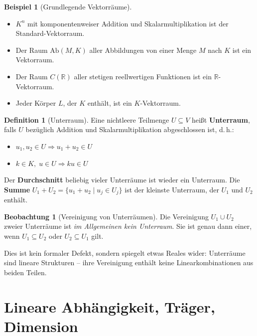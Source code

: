 ﻿\documentclass[a4paper,12pt]{report}
\theoremstyle{definition}
\newtheorem{definition}{Definition}
\newtheorem{beispiel}{Beispiel}
\newtheorem{beobachtung}{Beobachtung}
\begin{document}
\begin{beispiel}[Grundlegende Vektorräume]
    \begin{itemize}
        \item[-] $K^n$ mit komponentenweiser Addition und Skalarmultiplikation
              ist der Standard-Vektorraum.
        \item[-] Der Raum $\mathrm{Ab}(M, K)$ aller Abbildungen von einer
              Menge $M$ nach $K$ ist ein Vektorraum.
        \item[-] Der Raum $C(\mathbb{R})$ aller stetigen reellwertigen Funktionen
              ist ein $\mathbb{R}$-Vektorraum.
        \item[-] Jeder Körper $L$, der $K$ enthält, ist ein $K$-Vektorraum.
    \end{itemize}
\end{beispiel}

\begin{definition}[Unterraum]
    Eine nichtleere Teilmenge $U \subseteq V$ heißt \textbf{Unterraum}, falls
    $U$ bezüglich Addition und Skalarmultiplikation abgeschlossen ist, d.\,h.:
    \begin{itemize}
        \item[-] $u_1, u_2 \in U \Rightarrow u_1 + u_2 \in U$
        \item[-] $k \in K,\; u \in U \Rightarrow ku \in U$
    \end{itemize}
    Der \textbf{Durchschnitt} beliebig vieler Unterräume ist wieder ein
    Unterraum. Die \textbf{Summe} $U_1 + U_2 = \{u_1 + u_2 \mid u_j \in U_j\}$
    ist der kleinste Unterraum, der $U_1$ und $U_2$ enthält.
\end{definition}

\begin{beobachtung}[Vereinigung von Unterräumen]
    Die Vereinigung $U_1 \cup U_2$ zweier Unterräume ist \emph{im Allgemeinen
    kein Unterraum}. Sie ist genau dann einer, wenn $U_1 \subseteq U_2$ oder
    $U_2 \subseteq U_1$ gilt.

    Dies ist kein formaler Defekt, sondern spiegelt etwas Reales wider:
    Unterräume sind lineare Strukturen -- ihre Vereinigung enthält keine
    Linearkombinationen aus beiden Teilen.
\end{beobachtung}

\section{Lineare Abhängigkeit, Träger, Dimension}
\end{document}
